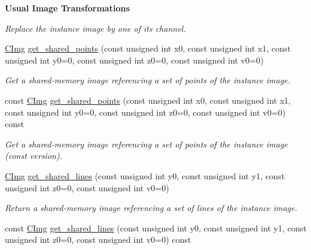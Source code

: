 \begin{Indent}{\bf Usual Image Transformations}
\begin{DoxyCompactItemize}
\begin{DoxyCompactList}\small\item\em Replace the instance image by one of its channel. \item\end{DoxyCompactList}\item 
\hypertarget{structcimg__library_1_1_c_img_a740f8962ff1960b9072a0210d743139c}{
\hyperlink{structcimg__library_1_1_c_img}{CImg} \hyperlink{structcimg__library_1_1_c_img_a740f8962ff1960b9072a0210d743139c}{get\_\-shared\_\-points} (const unsigned int x0, const unsigned int x1, const unsigned int y0=0, const unsigned int z0=0, const unsigned int v0=0)}
\label{structcimg__library_1_1_c_img_a740f8962ff1960b9072a0210d743139c}

\begin{DoxyCompactList}\small\item\em Get a shared-\/memory image referencing a set of points of the instance image. \item\end{DoxyCompactList}\item 
\hypertarget{structcimg__library_1_1_c_img_af07ddce901a21e91238f084e7aaa0ee6}{
const \hyperlink{structcimg__library_1_1_c_img}{CImg} \hyperlink{structcimg__library_1_1_c_img_af07ddce901a21e91238f084e7aaa0ee6}{get\_\-shared\_\-points} (const unsigned int x0, const unsigned int x1, const unsigned int y0=0, const unsigned int z0=0, const unsigned int v0=0) const }
\label{structcimg__library_1_1_c_img_af07ddce901a21e91238f084e7aaa0ee6}

\begin{DoxyCompactList}\small\item\em Get a shared-\/memory image referencing a set of points of the instance image (const version). \item\end{DoxyCompactList}\item 
\hypertarget{structcimg__library_1_1_c_img_aa1738c002377f0ada89048aae19388d5}{
\hyperlink{structcimg__library_1_1_c_img}{CImg} \hyperlink{structcimg__library_1_1_c_img_aa1738c002377f0ada89048aae19388d5}{get\_\-shared\_\-lines} (const unsigned int y0, const unsigned int y1, const unsigned int z0=0, const unsigned int v0=0)}
\label{structcimg__library_1_1_c_img_aa1738c002377f0ada89048aae19388d5}

\begin{DoxyCompactList}\small\item\em Return a shared-\/memory image referencing a set of lines of the instance image. \item\end{DoxyCompactList}\item 
\hypertarget{structcimg__library_1_1_c_img_a012e5781b88a060e5565098898f0358a}{
const \hyperlink{structcimg__library_1_1_c_img}{CImg} \hyperlink{structcimg__library_1_1_c_img_a012e5781b88a060e5565098898f0358a}{get\_\-shared\_\-lines} (const unsigned int y0, const unsigned int y1, const unsigned int z0=0, const unsigned int v0=0) const }
\label{structcimg__library_1_1_c_img_a012e5781b88a060e5565098898f0358a}


\end{DoxyCompactItemize}
\end{Indent}
